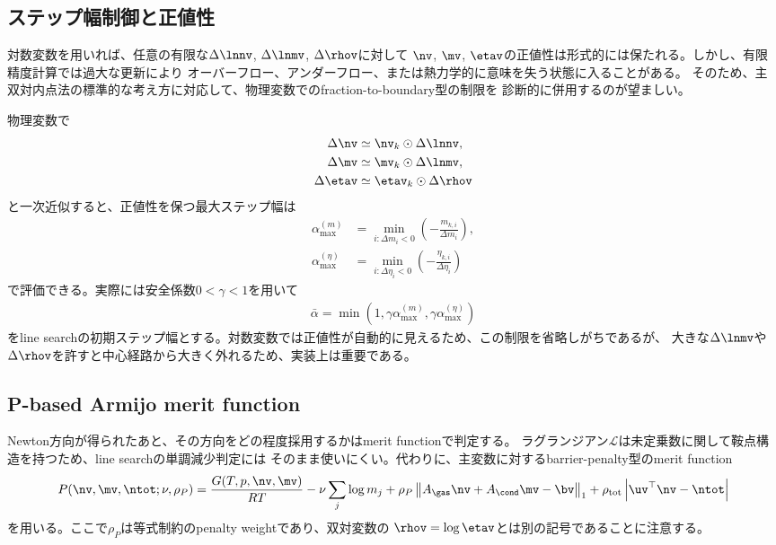 \subsection*{ステップ幅制御と正値性}

対数変数を用いれば、任意の有限な$\Delta \lnnv$, $\Delta \lnmv$, $\Delta \rhov$に対して
$\nv$, $\mv$, $\etav$の正値性は形式的には保たれる。しかし、有限精度計算では過大な更新により
オーバーフロー、アンダーフロー、または熱力学的に意味を失う状態に入ることがある。
そのため、主双対内点法の標準的な考え方に対応して、物理変数でのfraction-to-boundary型の制限を
診断的に併用するのが望ましい。

物理変数で
\begin{align}
    \Delta \nv &\simeq \nv_k \odot \Delta \lnnv,\\
    \Delta \mv &\simeq \mv_k \odot \Delta \lnmv,\\
    \Delta \etav &\simeq \etav_k \odot \Delta \rhov
\end{align}
と一次近似すると、正値性を保つ最大ステップ幅は
\begin{align}
    \alpha_{\max}^{(m)}
    &= \min_{i:\Delta m_i < 0} \left(- \frac{m_{k,i}}{\Delta m_i}\right),\\
    \alpha_{\max}^{(\eta)}
    &= \min_{i:\Delta \eta_i < 0} \left(- \frac{\eta_{k,i}}{\Delta \eta_i}\right)
\end{align}
で評価できる。実際には安全係数$0<\gamma<1$を用いて
\begin{align}
    \bar{\alpha}
    =
    \min\left(1,\gamma\alpha_{\max}^{(m)},\gamma\alpha_{\max}^{(\eta)}\right)
\end{align}
をline searchの初期ステップ幅とする。対数変数では正値性が自動的に見えるため、この制限を省略しがちであるが、
大きな$\Delta \lnmv$や$\Delta \rhov$を許すと中心経路から大きく外れるため、実装上は重要である。

\subsection*{P-based Armijo merit function}

Newton方向が得られたあと、その方向をどの程度採用するかはmerit functionで判定する。
ラグランジアン$\mathcal{L}$は未定乗数に関して鞍点構造を持つため、line searchの単調減少判定には
そのまま使いにくい。代わりに、主変数に対するbarrier-penalty型のmerit function
\begin{align}
    P(\nv,\mv,\ntot;\nu,\rho_P)
    =
    \frac{G(T,p,\nv,\mv)}{RT}
    - \nu \sum_j \log m_j
    + \rho_P \left\| A_\gas \nv + A_\cond \mv - \bv \right\|_1
    + \rho_{\rm tot}\left|\uv^\top \nv - \ntot\right|
\end{align}
を用いる。ここで$\rho_P$は等式制約のpenalty weightであり、双対変数の
$\rhov=\log\etav$とは別の記号であることに注意する。

